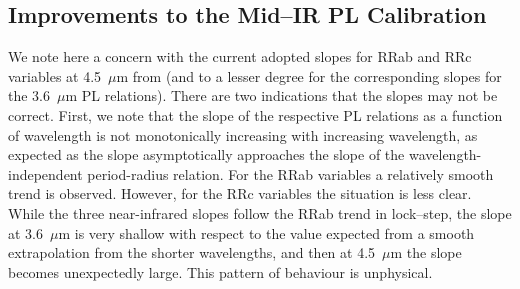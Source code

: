 \documentclass[a4paper,fleqn,usenatbib]{mnras}
\newcommand{\um}{~$\mu$m\xspace}
\begin{document}
%

\subsection{Improvements to the Mid--IR PL Calibration}
\label{sec:improvements}

We note here a concern with the current adopted slopes for RRab and RRc variables at 4.5\um from \citet{2015ApJ...808...11N} (and to a lesser degree for the corresponding slopes for the 3.6\um PL relations). There are two indications that the slopes may not be correct. First, we note that the slope of the respective PL relations as a function of wavelength is not monotonically increasing with increasing wavelength, as expected as the slope asymptotically approaches the slope of the wavelength-independent period-radius relation. For the RRab variables a relatively smooth trend is observed. However, for the RRc variables the situation is less clear. While the three near-infrared slopes follow the RRab trend in lock--step, the slope at 3.6\um is very shallow with respect to the value expected from a smooth extrapolation from the shorter wavelengths, and then at 4.5\um the slope becomes unexpectedly large. This pattern of behaviour is unphysical.
\end{document}
